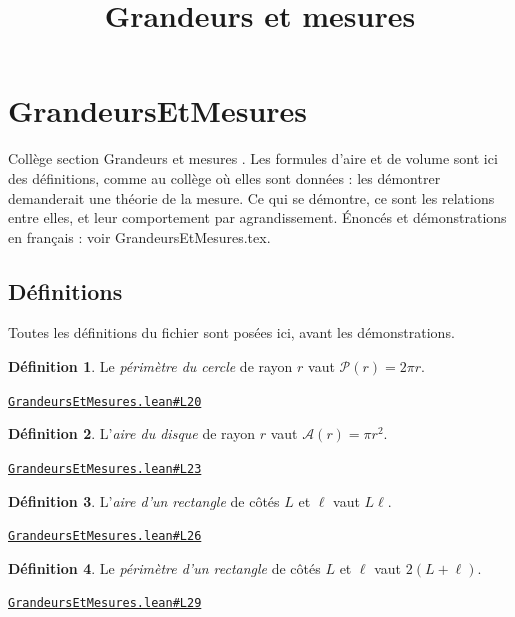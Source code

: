 \documentclass[11pt,a4paper]{article}
\title{Grandeurs et mesures}
\date{}
\theoremstyle{definition}
\newtheorem{definition}{Définition}
\theoremstyle{plain}
\newcommand{\source}[2]{\par\smallskip\noindent\hfill{\footnotesize\href{#1}{\texttt{#2}}}\par\smallskip}
\begin{document}
\maketitle
\sloppy

\section{GrandeursEtMesures}

\noindent
Collège \textemdash{} section \og{} Grandeurs et mesures \fg{}.
Les formules d'aire et de volume sont ici des définitions, comme au collège où elles sont
données : les démontrer demanderait une théorie de la mesure. Ce qui se démontre, ce sont
les relations entre elles, et leur comportement par agrandissement.
Énoncés et démonstrations en français : voir GrandeursEtMesures.tex.

\subsection{Définitions}

\noindent
Toutes les définitions du fichier sont posées ici, avant les démonstrations.

\begin{definition}
Le \emph{périmètre du cercle} de rayon $r$ vaut $\mathcal{P}(r) = 2\pi r$.
\end{definition}
\source{https://github.com/Commutator-IO/learn-lean/blob/main/courses/01-college/04-grandeurs-et-mesures/GrandeursEtMesures.lean\#L20}{GrandeursEtMesures.lean\#L20}

\begin{definition}
L'\emph{aire du disque} de rayon $r$ vaut $\mathcal{A}(r) = \pi r^2$.
\end{definition}
\source{https://github.com/Commutator-IO/learn-lean/blob/main/courses/01-college/04-grandeurs-et-mesures/GrandeursEtMesures.lean\#L23}{GrandeursEtMesures.lean\#L23}

\begin{definition}
L'\emph{aire d'un rectangle} de côtés $L$ et $\ell$ vaut $L\ell$.
\end{definition}
\source{https://github.com/Commutator-IO/learn-lean/blob/main/courses/01-college/04-grandeurs-et-mesures/GrandeursEtMesures.lean\#L26}{GrandeursEtMesures.lean\#L26}

\begin{definition}
Le \emph{périmètre d'un rectangle} de côtés $L$ et $\ell$ vaut $2(L + \ell)$.
\end{definition}
\source{https://github.com/Commutator-IO/learn-lean/blob/main/courses/01-college/04-grandeurs-et-mesures/GrandeursEtMesures.lean\#L29}{GrandeursEtMesures.lean\#L29}
\end{document}
